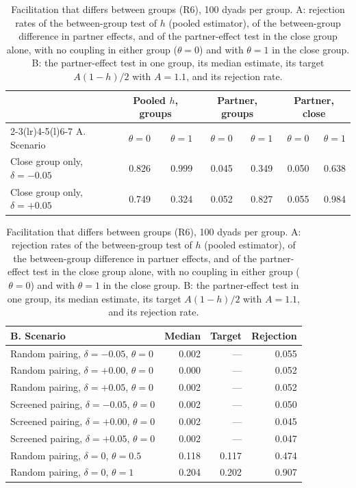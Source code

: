 \documentclass[12pt]{article}
\theoremstyle{definition}
\begin{document}
\begin{table}[H]
\centering\footnotesize
\caption{Facilitation that differs between groups (R6), 100 dyads per group.
A: rejection rates of the between-group test of $h$ (pooled estimator), of the
between-group difference in partner effects, and of the partner-effect test in
the close group alone, with no coupling in either group ($\theta=0$) and with
$\theta=1$ in the close group. B: the partner-effect test in one group, its median
estimate, its target $A(1-h)/2$ with $A=1.1$, and its rejection rate.}\label{tab:facil}
\setlength{\tabcolsep}{4pt}
\begin{tabular}{@{}lrrrrrr@{}}
\toprule
& \multicolumn{2}{c}{Pooled $h$, groups} & \multicolumn{2}{c}{Partner, groups} & \multicolumn{2}{c}{Partner, close}\\
\cmidrule(lr){2-3}\cmidrule(lr){4-5}\cmidrule(l){6-7}
A. Scenario & $\theta=0$ & $\theta=1$ & $\theta=0$ & $\theta=1$ & $\theta=0$ & $\theta=1$\\
\midrule
Close group only, $\delta=-0.05$ & 0.826 & 0.999 & 0.045 & 0.349 & 0.050 & 0.638\\
Close group only, $\delta=+0.05$ & 0.749 & 0.324 & 0.052 & 0.827 & 0.055 & 0.984\\
\bottomrule
\end{tabular}

\vspace{6pt}
\begin{tabular}{@{}lrrr@{}}
\toprule
B. Scenario & Median & Target & Rejection\\
\midrule
Random pairing, $\delta=-0.05$, $\theta=0$ & 0.002 & --- & 0.055\\
Random pairing, $\delta=+0.00$, $\theta=0$ & 0.000 & --- & 0.052\\
Random pairing, $\delta=+0.05$, $\theta=0$ & 0.002 & --- & 0.052\\
Screened pairing, $\delta=-0.05$, $\theta=0$ & 0.002 & --- & 0.050\\
Screened pairing, $\delta=+0.00$, $\theta=0$ & 0.002 & --- & 0.045\\
Screened pairing, $\delta=+0.05$, $\theta=0$ & 0.002 & --- & 0.047\\
Random pairing, $\delta=0$, $\theta=0.5$ & 0.118 & 0.117 & 0.474\\
Random pairing, $\delta=0$, $\theta=1$ & 0.204 & 0.202 & 0.907\\
\bottomrule
\end{tabular}
\end{table}
\end{document}
